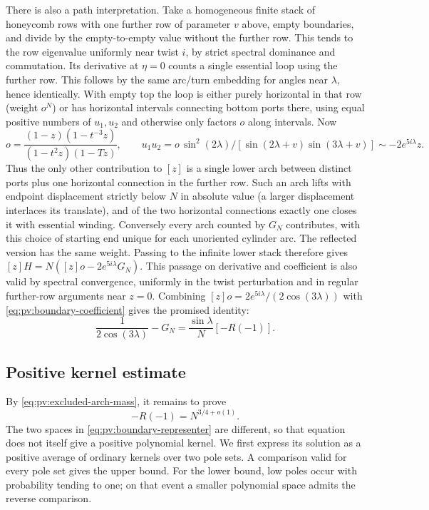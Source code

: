 There is also a path interpretation. Take a homogeneous finite stack of honeycomb rows with one further row of parameter \(v\) above, empty boundaries, and divide by the empty-to-empty value without the further row. This tends to the row eigenvalue uniformly near twist \(i\), by strict spectral dominance and commutation. Its derivative at \(\eta=0\) counts a single essential loop using the further row. This follows by the same arc/turn embedding for angles near \(\lambda\), hence identically. With empty top the loop is either purely horizontal in that row (weight \(o^N\)) or has horizontal intervals connecting bottom ports there, using equal positive numbers of \(u_1,u_2\) and otherwise only factors \(o\) along intervals. Now
\[
 o=\frac{(1-z)(1-t^{-3}z)}{(1-t^2z)(1-Tz)},\qquad
 u_1u_2=o\,\sin^2(2\lambda)/[\sin(2\lambda+v)\sin(3\lambda+v)]\sim-2 e^{5i\lambda}z .
\]
Thus the only other contribution to \([z]\) is a single lower arch between distinct ports plus one horizontal connection in the further row. Such an arch lifts with endpoint displacement strictly below \(N\) in absolute value (a larger displacement interlaces its translate), and of the two horizontal connections exactly one closes it with essential winding. Conversely every arch counted by \(G_N\) contributes, with this choice of starting end unique for each unoriented cylinder arc. The reflected version has the same weight. Passing to the infinite lower stack therefore gives \([z]H=N([z]o-2e^{5i\lambda}G_N)\). This passage on derivative and coefficient is also valid by spectral convergence, uniformly in the twist perturbation and in regular further-row arguments near \(z=0\). Combining \([z]o=2e^{5i\lambda}/(2\cos(3\lambda))\) with \eqref{eq:pv:boundary-coefficient} gives the promised identity:
\begin{equation}\label{eq:pv:excluded-arch-mass}
 \frac1{2\cos(3\lambda)}-G_N=\frac{\sin\lambda}{N}[-R(-1)] .
\end{equation}

\subsection{Positive kernel estimate}\label{c01-c1-positive-kernel-estimate}

By \eqref{eq:pv:excluded-arch-mass}, it remains to prove
\begin{equation}\label{eq:pv:boundary-kernel-power}
 -R(-1)=N^{3/4+o(1)}.
\end{equation}
The two spaces in \eqref{eq:pv:boundary-representer} are different, so that equation does not itself give a positive polynomial kernel. We first express its solution as a positive average of ordinary kernels over two pole sets. A comparison valid for every pole set gives the upper bound. For the lower bound, low poles occur with probability tending to one; on that event a smaller polynomial space admits the reverse comparison.


